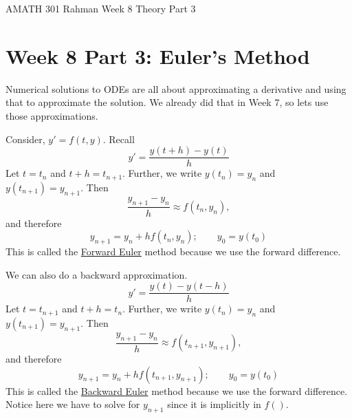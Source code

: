 \documentclass[reqno]{amsart}
\theoremstyle{definition}
\begin{document}
\begin{flushleft}
{\sc \Large AMATH 301 Rahman} \hfill Week 8 Theory Part 3
\bigskip
\end{flushleft}

\newcommand{\R}{\mathbb{R}}
\newcommand{\N}{\mathbb{N}}
\newcommand{\Z}{\mathbb{Z}}
\newcommand{\Q}{\mathbb{Q}}
\renewcommand{\CancelColor}{\color{red}}
\newcommand{\?}{\stackrel{?}{=}}
\renewcommand{\varphi}{\phi}
\newcommand{\card}{\text{Card}}
\newcommand{\bigzero}{\text{\Huge 0}}
\newcommand{\curvearrowdown}{{\color{red}\rotatebox{90}{$\curvearrowleft$}}}
\newcommand{\curvearrowup}{{\color{red}\rotatebox{90}{$\curvearrowright$}}}



\section*{Week 8 Part 3:  Euler's Method}

Numerical solutions to ODEs are all about approximating a derivative and using that to approximate the solution.  We already did that in Week 7, so lets use those approximations.

Consider, $y' = f(t,y)$.  Recall
%
\begin{equation*}
y' = \frac{y(t+h) - y(t)}{h}
\end{equation*}
%
Let $t = t_n$ and $t+h = t_{n+1}$.  Further, we write $y(t_n) = y_n$ and $y(t_{n+1}) = y_{n+1}$.  Then
%
\begin{equation*}
\frac{y_{n+1} - y_n}{h} \approx f(t_n,y_n),
\end{equation*}
%
and therefore
%
\begin{equation}
y_{n+1} = y_n + hf(t_n,y_n);\qquad y_0 = y(t_0)
\end{equation}
%
{\color{red} This is called the \underline{Forward Euler} method because we use the forward difference}.

We can also do a backward approximation.
%
\begin{equation*}
y' = \frac{y(t) - y(t-h)}{h}
\end{equation*}
%
Let $t = t_{n+1}$ and $t+h = t_n$.  Further, we write $y(t_n) = y_n$ and $y(t_{n+1}) = y_{n+1}$.  Then
%
\begin{equation*}
\frac{y_{n+1} - y_n}{h} \approx f(t_{n+1},y_{n+1}),
\end{equation*}
%
and therefore
%
\begin{equation}
y_{n+1} = y_n + hf(t_{n+1},y_{n+1});\qquad y_0 = y(t_0)
\end{equation}
%
{\color{red} This is called the \underline{Backward Euler} method because we use the forward difference}.
{\color{blue} Notice here we have to solve for $y_{n+1}$ since it is implicitly in $f()$}.
\end{document}
